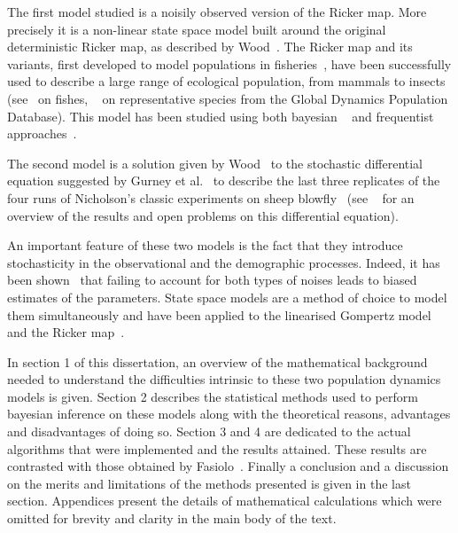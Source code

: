 \documentclass[12pt]{article}
\begin{document}
	The first model studied is a noisily observed version of the Ricker map. More precisely it is a non-linear state space model built around the original deterministic Ricker map, as described by Wood~\cite{wood2010statistical}. The Ricker map and its variants, first developed to model populations in fisheries~\cite{Ricker1954}, have been successfully used to describe a large range of ecological population, from mammals to insects (see~\cite{myers1999maximum, mueter2002opposite, krkovsek2007declining} on fishes, ~\cite{sibly2005regulation, gao2012bayesian} on representative species from the Global Dynamics Population Database). This model has been studied using both bayesian ~\cite{wood2010statistical, gao2012bayesian, fasiolo2014statistical} and frequentist approaches~\cite{sibly2005regulation, yang2008importance}.
	
	The second model is a solution given by Wood~\cite{wood2010statistical} to the stochastic differential equation suggested by Gurney et al.~\cite{gurney1980nicholson} to describe the last three replicates of the four runs of Nicholson’s classic experiments on sheep blowfly~\cite{nicholson1954outline, nicholson1957self} (see ~\cite{berezansky2010nicholson} for an overview of the results and open problems on this differential equation).
	
	An important feature of these two models is the fact that they introduce stochasticity in the observational and the demographic processes. Indeed, it has been shown~\cite{stenseth2003seasonality, carroll2006measurement, freckleton2006census} that failing to account for both types of noises leads to biased estimates of the parameters. State space models are a method of choice to model them simultaneously and have been applied to the linearised Gompertz model~\cite{meyer1999bugs, viljugrein2005density, wang2006spatial} and the Ricker map~\cite{de2002fitting, calder2003incorporating}.
	
	In section 1 of this dissertation, an overview of the mathematical background needed to understand the difficulties intrinsic to these two population dynamics models is given. Section 2 describes the statistical methods used to perform bayesian inference on these models along with the theoretical reasons, advantages and disadvantages of doing so. Section 3 and 4 are dedicated to the actual algorithms that were implemented and the results attained. These results are contrasted with those obtained by Fasiolo~\cite{fasiolo2014statistical}. Finally a conclusion and a discussion on the merits and limitations of the methods presented is given in the last section. Appendices present the details of mathematical calculations which were omitted for brevity and clarity in the main body of the text.
	
\end{document}
